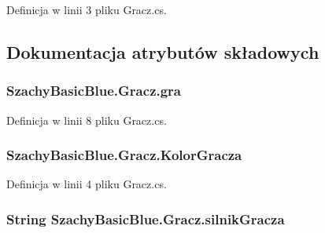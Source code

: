 Definicja w linii 3 pliku Gracz.\-cs.



\subsection{Dokumentacja atrybutów składowych}
\hypertarget{class_szachy_basic_blue_1_1_gracz_a87917de01bff4f9a56543f05b95bd4d3}{
\subsubsection[{gra}]{ Szachy\-Basic\-Blue.\-Gracz.\-gra\hspace{0.3cm}{\ttfamily [private]}}}\label{class_szachy_basic_blue_1_1_gracz_a87917de01bff4f9a56543f05b95bd4d3}


Definicja w linii 8 pliku Gracz.\-cs.

\hypertarget{class_szachy_basic_blue_1_1_gracz_a1ead8290dd8833563a97ab2a9ee47f7c}{
\subsubsection[{Kolor\-Gracza}]{ Szachy\-Basic\-Blue.\-Gracz.\-Kolor\-Gracza}}\label{class_szachy_basic_blue_1_1_gracz_a1ead8290dd8833563a97ab2a9ee47f7c}


Definicja w linii 4 pliku Gracz.\-cs.

\hypertarget{class_szachy_basic_blue_1_1_gracz_ad8698b29d6554cefa6143fb2d8b69451}{
\subsubsection[{silnik\-Gracza}]{\setlength{\rightskip}{0pt plus 5cm}String Szachy\-Basic\-Blue.\-Gracz.\-silnik\-Gracza\hspace{0.3cm}{\ttfamily [private]}}}\label{class_szachy_basic_blue_1_1_gracz_ad8698b29d6554cefa6143fb2d8b69451}



